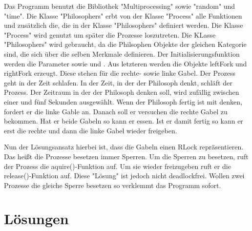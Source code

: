 Das Programm benutzt die Bibliothek "Multiprocessing" sowie "random" und "time". Die Klasse "Philosophers" erbt von der Klasse "Process" alle Funktionen und zusätzlich die, die in der Klasse "Philosophers" definiert werden. Die Klasse "Process" wird genutzt um später die Prozesse loszutreten. Die KLasse "Philosophers" wird gebraucht, da die Philsophen Objekte der gleichen Kategorie sind, die sich über die selben Merkmale definieren. Der Initialisierungsfunktion werden die Parameter  sowie  und  . Aus letzteren werden die Objekte leftFork und rightFork erzeugt. Diese stehen für die rechte- sowie linke Gabel. Der Prozess geht in der Zeit schlafen. In der Zeit, in der der Philosoph denkt, schläft der Prozess. Der Zeitraum in der der Philosoph denken soll, wird zufällig zwischen einer und fünf Sekunden ausgewählt. Wenn der Philosoph fertig ist mit denken, fordert er die linke Gable an. Danach soll er versuchen die rechte Gabel zu bekommen. Hat er beide Gabeln so kann er essen. Ist er damit fertig so kann er erst die rechte und dann die linke Gabel wieder freigeben.

Nun der Lösungsansatz hierbei ist, dass die Gabeln einen RLock repräsentieren. Das heißt die Prozesse besetzen immer Sperren. Um die Sperren zu besetzen, ruft der Prozess die aquire()-Funktion auf. Um sie wieder freizugeben ruft er die release()-Funktion auf. Diese "Lösung" ist jedoch nicht deadlockfrei. Wollen zwei Prozesse die gleiche Sperre besetzen so verklemmt das Programm sofort. 

\section{Lösungen}
\label{endlösung}

 









